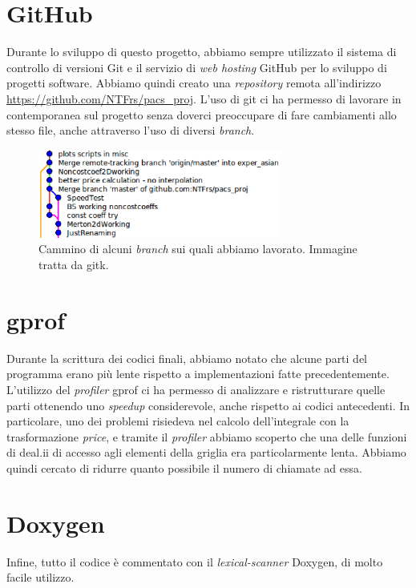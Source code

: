\documentclass[a4paper,10pt]{report}
\theoremstyle{plain}
\theoremstyle{definition}
\theoremstyle{remark}
\begin{document}
\section{GitHub}
Durante lo sviluppo di questo progetto, abbiamo sempre utilizzato il sistema di controllo di versioni Git e il servizio di \emph{web hosting} GitHub per lo sviluppo di progetti software. Abbiamo quindi creato una \emph{repository} remota all'indirizzo \url{https://github.com/NTFrs/pacs_proj}. L'uso di git ci ha permesso di lavorare in contemporanea sul progetto senza doverci preoccupare di fare cambiamenti allo stesso file, anche attraverso l'uso di diversi \emph{branch}.
\begin{figure}[!h]
 \begin{center}
 \includegraphics[width=8cm]{img/Git.eps}
 \caption{Cammino di alcuni \emph{branch} sui quali abbiamo lavorato. Immagine tratta da \textsf{gitk}.}
 \label{fig:gitk}
 \end{center}
\end{figure}

\section{\textsf{gprof}}
Durante la scrittura dei codici finali, abbiamo notato che alcune parti del programma erano più lente rispetto a implementazioni fatte precedentemente. L'utilizzo del \emph{profiler} \textsf{gprof} ci ha permesso di analizzare e ristrutturare quelle parti ottenendo uno \emph{speedup} considerevole, anche rispetto ai codici antecedenti. In particolare, uno dei problemi risiedeva nel calcolo dell'integrale con la trasformazione \emph{price}, e tramite il \emph{profiler} abbiamo scoperto che una delle funzioni di \textsf{deal.ii} di accesso agli elementi della griglia era particolarmente lenta. Abbiamo quindi cercato di ridurre quanto possibile il numero di chiamate ad essa.
\section{\textsf{Doxygen}}
Infine, tutto il codice \`e commentato con il \emph{lexical-scanner} \textsf{Doxygen}, di molto facile utilizzo. 
\end{document}
